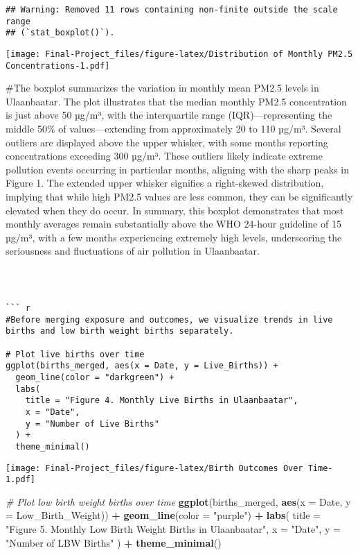 \documentclass[
]{article}
\newenvironment{Shaded}{\begin{snugshade}}{\end{snugshade}}
\newcommand{\AttributeTok}[1]{\textcolor[rgb]{0.13,0.29,0.53}{#1}}
\newcommand{\CommentTok}[1]{\textcolor[rgb]{0.56,0.35,0.01}{\textit{#1}}}
\newcommand{\FunctionTok}[1]{\textcolor[rgb]{0.13,0.29,0.53}{\textbf{#1}}}
\newcommand{\NormalTok}[1]{#1}
\newcommand{\SpecialCharTok}[1]{\textcolor[rgb]{0.81,0.36,0.00}{\textbf{#1}}}
\newcommand{\StringTok}[1]{\textcolor[rgb]{0.31,0.60,0.02}{#1}}
\begin{document}
\begin{verbatim}
## Warning: Removed 11 rows containing non-finite outside the scale range
## (`stat_boxplot()`).
\end{verbatim}

\texttt{[image: Final-Project\_files/figure-latex/Distribution of Monthly PM2.5 Concentrations-1.pdf]}

\#The boxplot summarizes the variation in monthly mean PM2.5 levels in
Ulaanbaatar. The plot illustrates that the median monthly PM2.5
concentration is just above 50 µg/m³, with the interquartile range
(IQR)---representing the middle 50\% of values---extending from
approximately 20 to 110 µg/m³. Several outliers are displayed above the
upper whisker, with some months reporting concentrations exceeding 300
µg/m³. These outliers likely indicate extreme pollution events occurring
in particular months, aligning with the sharp peaks in Figure 1. The
extended upper whisker signifies a right-skewed distribution, implying
that while high PM2.5 values are less common, they can be significantly
elevated when they do occur. In summary, this boxplot demonstrates that
most monthly averages remain substantially above the WHO 24-hour
guideline of 15 µg/m³, with a few months experiencing extremely high
levels, underscoring the seriousness and fluctuations of air pollution
in Ulaanbaatar.

\begin{verbatim}



``` r
#Before merging exposure and outcomes, we visualize trends in live births and low birth weight births separately.

# Plot live births over time
ggplot(births_merged, aes(x = Date, y = Live_Births)) +
  geom_line(color = "darkgreen") +
  labs(
    title = "Figure 4. Monthly Live Births in Ulaanbaatar",
    x = "Date",
    y = "Number of Live Births"
  ) +
  theme_minimal()
\end{verbatim}

\texttt{[image: Final-Project\_files/figure-latex/Birth Outcomes Over Time-1.pdf]}

\begin{Shaded}
\begin{Highlighting}[]
\CommentTok{\# Plot low birth weight births over time}
\FunctionTok{ggplot}\NormalTok{(births\_merged, }\FunctionTok{aes}\NormalTok{(}\AttributeTok{x =}\NormalTok{ Date, }\AttributeTok{y =}\NormalTok{ Low\_Birth\_Weight)) }\SpecialCharTok{+}
  \FunctionTok{geom\_line}\NormalTok{(}\AttributeTok{color =} \StringTok{"purple"}\NormalTok{) }\SpecialCharTok{+}
  \FunctionTok{labs}\NormalTok{(}
    \AttributeTok{title =} \StringTok{"Figure 5. Monthly Low Birth Weight Births in Ulaanbaatar"}\NormalTok{,}
    \AttributeTok{x =} \StringTok{"Date"}\NormalTok{,}
    \AttributeTok{y =} \StringTok{"Number of LBW Births"}
\NormalTok{  ) }\SpecialCharTok{+}
  \FunctionTok{theme\_minimal}\NormalTok{()}
\end{Highlighting}
\end{Shaded}
\end{document}
